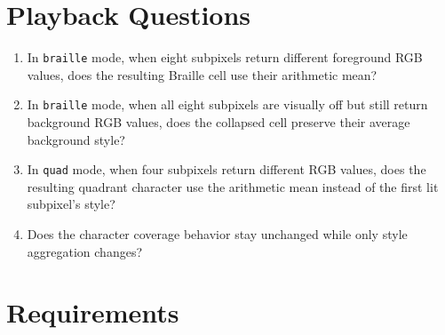 \section{Playback Questions}\label{record-158-playback-questions}

\begin{enumerate}
\def\labelenumi{\arabic{enumi}.}
\tightlist
\item
  In \texttt{b\allowbreak{}r\allowbreak{}a\allowbreak{}i\allowbreak{}l\allowbreak{}l\allowbreak{}e} mode, when eight subpixels return different foreground RGB values, does the resulting Braille cell use their arithmetic mean?
\item
  In \texttt{b\allowbreak{}r\allowbreak{}a\allowbreak{}i\allowbreak{}l\allowbreak{}l\allowbreak{}e} mode, when all eight subpixels are visually off but still return background RGB values, does the collapsed cell preserve their average background style?
\item
  In \texttt{q\allowbreak{}u\allowbreak{}a\allowbreak{}d} mode, when four subpixels return different RGB values, does the resulting quadrant character use the arithmetic mean instead of the first lit subpixel's style?
\item
  Does the character coverage behavior stay unchanged while only style aggregation changes?
\end{enumerate}

\section{Requirements}\label{record-158-requirements}

